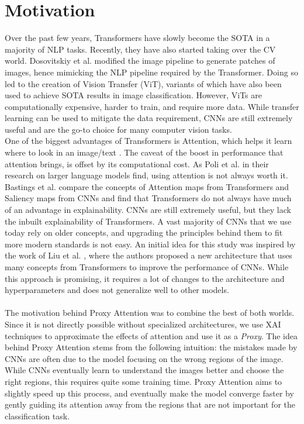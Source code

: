 \documentclass[a4paper,11pt,openright]{book}
\begin{document}
\section{Motivation}
Over the past few years, Transformers have slowly become the SOTA in a majority of NLP tasks. Recently, they have also started taking over the CV world. Dosovitskiy et al. \cite{dosovitskiyImageWorth16x162021}  modified the image pipeline to generate patches of images, hence mimicking the NLP pipeline required by the Transformer. Doing so led to the creation of Vision Transfer (ViT), variants of which have also been used to achieve SOTA results in image classification. However, ViTs are computationally expensive, harder to train, and require more data. While transfer learning can be used to mitigate the data requirement, CNNs are still extremely useful and are the go-to choice for many computer vision tasks.\\
One of the biggest advantages of Transformers is Attention, which helps it learn where to look in an image/text \cite{vaswaniAttentionAllYou2017}. The caveat of the boost in performance that attention brings, is offset by its computational cost. As Poli et al. \cite{poliHyenaHierarchyLarger2023} in their research on larger language models find, using attention is not always worth it. Bastings et al. \cite{bastingsElephantInterpretabilityRoom2020} compare the concepts of Attention maps from Transformers and Saliency maps from CNNs and find that Transformers do not always have much of an advantage in explainability. CNNs are still extremely useful, but they lack the inbuilt explainability of Transformers. A vast majority of CNNs that we use today rely on older concepts, and upgrading the principles behind them to fit more modern standards is not easy. An initial idea for this study was inspired by the work of Liu et al. \cite{liuConvNet2020s2022}, where the authors proposed a new architecture that uses many concepts from Transformers to improve the performance of CNNs. While this approach is promising, it requires a lot of changes to the architecture and hyperparameters and does not generalize well to other models. \\\\
The motivation behind Proxy Attention was to combine the best of both worlds. Since it is not directly possible without specialized architectures, we use XAI techniques to approximate the effects of attention and use it as a \textit{Proxy}. The idea behind Proxy Attention stems from the following intuition: the mistakes made by CNNs are often due to the model focusing on the wrong regions of the image. While CNNs eventually learn to understand the images better and choose the right regions, this requires quite some training time. Proxy Attention aims to slightly speed up this process, and eventually make the model converge faster by gently guiding its attention away from the regions that are not important for the classification task.\\
\end{document}
